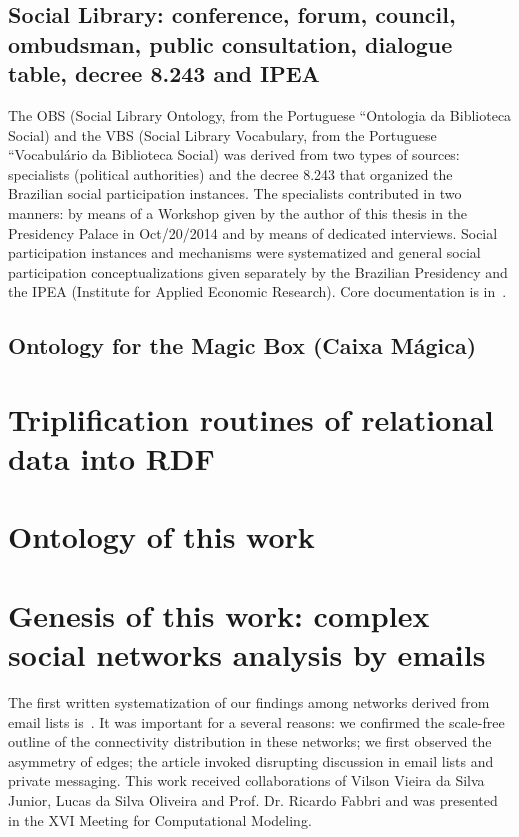 \begin{apendicesenv}
\subsection{Social Library: conference, forum, council, ombudsman, public consultation, dialogue table, decree 8.243 and IPEA}
The OBS (Social Library Ontology, from the Portuguese ``Ontologia da Biblioteca Social)
and the VBS (Social Library Vocabulary, from the Portuguese ``Vocabulário da Biblioteca Social)
was derived from two types of sources: specialists (political authorities)
and the decree 8.243 that organized the Brazilian social participation instances.
The specialists contributed in two manners: by means of a Workshop given by the author 
of this thesis in the Presidency Palace in Oct/20/2014
and by means of dedicated interviews.
Social participation instances and mechanisms were systematized and general
social participation conceptualizations given separately by the Brazilian Presidency
and the IPEA (Institute for Applied Economic Research).
Core documentation is in~\cite{opa}.

\subsection{Ontology for the Magic Box (Caixa Mágica)}\label{sec:mb}

\section{Triplification routines of relational data into RDF}

\section{Ontology of this work}

\section{Genesis of this work: complex social networks analysis by emails}
The first written systematization of our findings among networks derived from email lists
is~\cite{comp1}.
It was important for a several reasons: we confirmed the scale-free outline of the connectivity distribution
in these networks;
we first observed the asymmetry of edges;
the article invoked disrupting discussion in email lists and private messaging.
This work received collaborations of Vilson Vieira da Silva Junior, Lucas da Silva Oliveira
and Prof. Dr. Ricardo Fabbri
and was presented in the XVI Meeting for Computational Modeling.

\end{apendicesenv}
